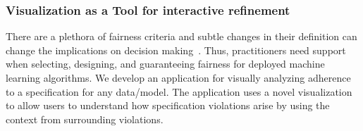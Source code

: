     \subsubsection{Visualization as a Tool for interactive refinement}

There are a plethora of fairness criteria and subtle changes in their definition can change the implications on decision making~\citep{castelnovo2021zoo}.
Thus, practitioners need support when selecting, designing, and guaranteeing fairness for deployed machine learning algorithms.
We develop an application for visually analyzing adherence to a specification for any data/model. 
The application uses a novel visualization to allow users to understand how specification violations arise by using the context from surrounding violations.

